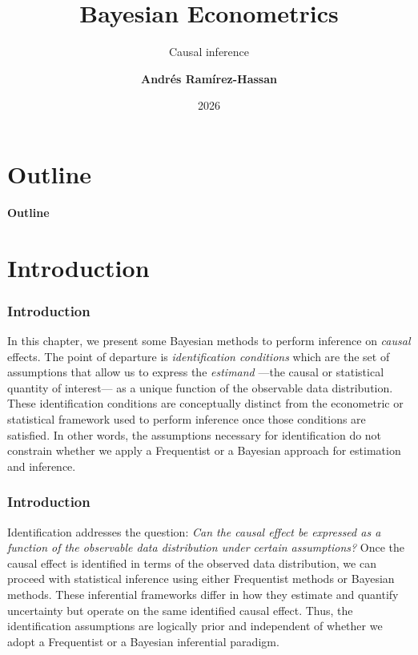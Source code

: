 \documentclass[12pt, compress]{beamer}
\title{Bayesian Econometrics}
\subtitle{Causal inference}
\date{2026}
\author[Andr\'e Ram\'irez H.]{\textbf{Andr\'es Ram\'irez-Hassan}}
\institute[EAFIT]{\small{Universidad EAFIT\\School of Finance, Economics and Government}}
\begin{document}
	
	\maketitle
	
	
	
	
	\section*{Outline}
	\begin{frame}
		\textbf{\Large{Outline}}
		\tableofcontents
	\end{frame}
	
\section{Introduction}
	
\begin{frame}
	\frametitle{Introduction}
In this chapter, we present some Bayesian methods to perform inference on \textit{causal} effects. The point of departure is \textit{identification conditions} which are the set of assumptions that allow us to express the \textit{estimand} —the causal or statistical quantity of interest— as a unique function of the observable data distribution. These identification conditions are conceptually distinct from the econometric or statistical framework used to perform inference once those conditions are satisfied. In other words, the assumptions necessary for identification do not constrain whether we apply a Frequentist or a Bayesian approach for estimation and inference.
\end{frame}

\begin{frame}
	\frametitle{Introduction}
Identification addresses the question: \textit{Can the causal effect be expressed as a function of the observable data distribution under certain assumptions?} Once the causal effect is identified in terms of the observed data distribution, we can proceed with statistical inference using either Frequentist methods or Bayesian methods. These inferential frameworks differ in how they estimate and quantify uncertainty but operate on the same identified causal effect. Thus, the identification assumptions are logically prior and independent of whether we adopt a Frequentist or a Bayesian inferential paradigm.
\end{frame}
\end{document}

